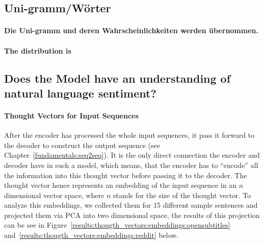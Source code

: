 \subsection{Uni-gramm/Wörter}
\paragraph{Die Uni-gramm und deren Wahrscheinlichkeiten werden übernommen.}
\paragraph{The distribution is}

\subsection{Does the Model have an understanding of natural language sentiment?}

\paragraph{Thought Vectors for Input Sequences}After the encoder has processed the whole input sequences, it pass it forward to the decoder to construct the output sequence (see Chapter~\ref{fundamentals:seq2seq}). It is the only direct connection the encoder and decoder have in such a model, which means, that the encoder has to ``encode'' all the information into this thought vector before passing it to the decoder. The thought vector hence represents an embedding of the input sequence in an $n$ dimensional vector space, where $n$ stands for the size of the thought vector. To analyze this embeddings, we collected them for 15 different sample sentences and projected them via PCA into two dimensional space, the results of this projection can be see in Figure~\ref{results:thougth_vectors:embeddings:opensubtitles} and~\ref{results:thougth_vectors:embeddings:reddit} below.

